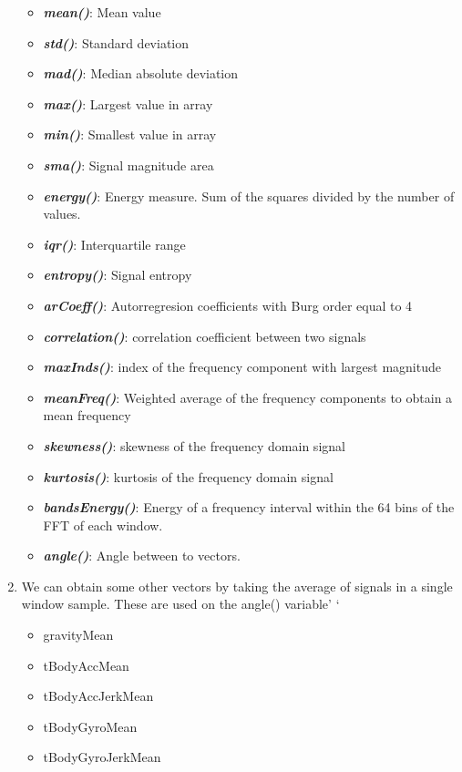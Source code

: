 \documentclass[11pt]{article}
\providecommand{\tightlist}{%
      \setlength{\itemsep}{0pt}\setlength{\parskip}{0pt}}
\begin{document}
\begin{enumerate}
  \begin{itemize}
  \tightlist
  \item
    \textbf{\emph{mean()}}: Mean value
  \item
    \textbf{\emph{std()}}: Standard deviation
  \item
    \textbf{\emph{mad()}}: Median absolute deviation
  \item
    \textbf{\emph{max()}}: Largest value in array
  \item
    \textbf{\emph{min()}}: Smallest value in array
  \item
    \textbf{\emph{sma()}}: Signal magnitude area
  \item
    \textbf{\emph{energy()}}: Energy measure. Sum of the squares divided
    by the number of values.
  \item
    \textbf{\emph{iqr()}}: Interquartile range
  \item
    \textbf{\emph{entropy()}}: Signal entropy
  \item
    \textbf{\emph{arCoeff()}}: Autorregresion coefficients with Burg
    order equal to 4
  \item
    \textbf{\emph{correlation()}}: correlation coefficient between two
    signals
  \item
    \textbf{\emph{maxInds()}}: index of the frequency component with
    largest magnitude
  \item
    \textbf{\emph{meanFreq()}}: Weighted average of the frequency
    components to obtain a mean frequency
  \item
    \textbf{\emph{skewness()}}: skewness of the frequency domain signal
  \item
    \textbf{\emph{kurtosis()}}: kurtosis of the frequency domain signal
  \item
    \textbf{\emph{bandsEnergy()}}: Energy of a frequency interval within
    the 64 bins of the FFT of each window.
  \item
    \textbf{\emph{angle()}}: Angle between to vectors.
  \end{itemize}
\item
  We can obtain some other vectors by taking the average of signals in a
  single window sample. These are used on the angle() variable' `

  \begin{itemize}
  \tightlist
  \item
    gravityMean
  \item
    tBodyAccMean
  \item
    tBodyAccJerkMean
  \item
    tBodyGyroMean
  \item
    tBodyGyroJerkMean
  \end{itemize}
\end{enumerate}
\end{document}
